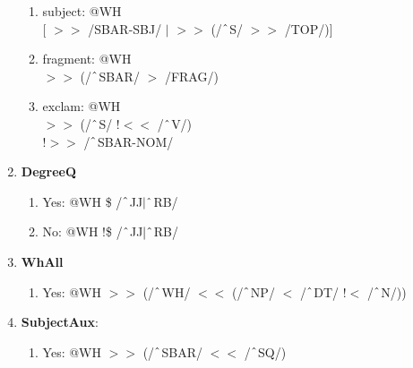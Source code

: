 \begin{enumerate}
\begin{enumerate}
            \item subject: @WH \\
            {}[ $>\!\!>$ /SBAR-SBJ/ $|$ $>\!\!>$ (/$\string^$S/ $>\!\!>$ /TOP/)]

            \item fragment: @WH \\
            $>\!\!>$ (/$\string^$SBAR/ $>$ /FRAG/)
            
            \item exclam: @WH\\ 
            $>\!\!>$ (/$\string^$S/ !$<\!\!<$ /$\string^$V/) \\
            !$>\!\!>$ /$\string^$SBAR-NOM/
        \end{enumerate}
    \item \textbf{DegreeQ}
        \begin{enumerate}
            \item Yes: @WH \$ /$\string^$JJ$|\string^$RB/
            \item No: @WH !\$ /$\string^$JJ$|\string^$RB/
        \end{enumerate}
    \item \textbf{WhAll}
        \begin{enumerate}
            \item Yes: @WH $>\!\!>$ (/$\string^$WH/ $<\!\!<$ (/$\string^$NP/ $<$ /$\string^$DT/ !$<$ /$\string^$N/))
        \end{enumerate}
    \item \textbf{SubjectAux}: 
        \begin{enumerate}
            \item Yes: @WH $>\!\!>$ (/$\string^$SBAR/ $<\!\!<$ /$\string^$SQ/)
        \end{enumerate}
    
\end{enumerate}


